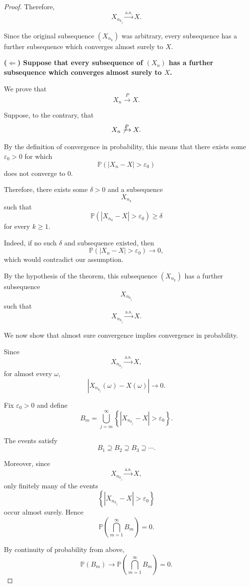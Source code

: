 \begin{proof}
Therefore,
\[
    \boxed{
    X_{n_{k_j}}\xrightarrow{\mathrm{a.s.}}X.
    }
\]

Since the original subsequence $(X_{n_k})$ was arbitrary, every
subsequence has a further subsequence which converges almost surely
to $X$.

\medskip

\noindent
\textbf{($\Leftarrow$) Suppose that every subsequence of $(X_n)$ has
a further subsequence which converges almost surely to $X$.}

We prove that
\[
    X_n\xrightarrow{P}X.
\]

Suppose, to the contrary, that
\[
    X_n\not\xrightarrow{P}X.
\]

By the definition of convergence in probability, this means that there
exists some $\varepsilon_0>0$ for which
\[
    \mathbb P(|X_n-X|>\varepsilon_0)
\]
does not converge to $0$.

Therefore, there exists some $\delta>0$ and a subsequence
\[
    X_{n_k}
\]
such that
\[
    \mathbb P(|X_{n_k}-X|>\varepsilon_0)
    \geq\delta
\]
for every $k\geq1$.

Indeed, if no such $\delta$ and subsequence existed, then
\[
    \mathbb P(|X_n-X|>\varepsilon_0)\longrightarrow0,
\]
which would contradict our assumption.

By the hypothesis of the theorem, this subsequence $(X_{n_k})$ has a
further subsequence
\[
    X_{n_{k_j}}
\]
such that
\[
    X_{n_{k_j}}\xrightarrow{\mathrm{a.s.}}X.
\]

We now show that almost sure convergence implies convergence in
probability.

Since
\[
    X_{n_{k_j}}\xrightarrow{\mathrm{a.s.}}X,
\]
for almost every $\omega$,
\[
    |X_{n_{k_j}}(\omega)-X(\omega)|
    \longrightarrow0.
\]

Fix $\varepsilon_0>0$ and define
\[
    B_m
    =
    \bigcup_{j=m}^{\infty}
    \left\{
        |X_{n_{k_j}}-X|>\varepsilon_0
    \right\}.
\]

The events satisfy
\[
    B_1\supseteq B_2\supseteq B_3\supseteq\cdots.
\]

Moreover, since
\[
    X_{n_{k_j}}\xrightarrow{\mathrm{a.s.}}X,
\]
only finitely many of the events
\[
    \left\{
        |X_{n_{k_j}}-X|>\varepsilon_0
    \right\}
\]
occur almost surely. Hence
\[
    \mathbb P\left(\bigcap_{m=1}^{\infty}B_m\right)=0.
\]

By continuity of probability from above,
\[
    \mathbb P(B_m)
    \longrightarrow
    \mathbb P\left(\bigcap_{m=1}^{\infty}B_m\right)
    =0.
\]


\end{proof}
